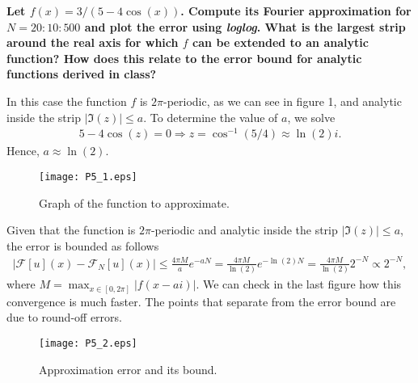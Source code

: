\textbf{Let $f(x)=3/(5-4\cos(x))$. Compute its Fourier approximation for $N = 20 : 10 : 500$ and plot the error using \textsl{loglog}. What is the largest strip around the real axis for which $f$ can be extended to an analytic function? How does this relate to the error bound for analytic functions derived in class?}
\newline

In this case the function $f$ is $2\pi$-periodic, as we can see in figure 1, and analytic inside the strip $|\Im(z)|\leq a$. To determine the value of $a$, we solve
\begin{align*}
5-4\cos(z)=0 \Rightarrow z=\cos^{-1}(5/4)\approx\ln(2)i. 
\end{align*}
Hence, $a\approx \ln(2)$. 
\begin{figure}[H]
\centering     %
{\texttt{[image: P5\_1.eps]}}
\caption{Graph of the function to approximate.}
\end{figure}

Given that the function is $2\pi$-periodic and analytic inside the strip $|\Im(z)|\leq a$, the error is bounded as follows
\begin{align*}
\left|\mathcal{F}[u](x)-\mathcal{F}_N[u](x)\right|\leq \frac{4\pi M}{a}e^{-aN} = \frac{4\pi M}{\ln(2)}e^{-\ln(2)N} = \frac{4\pi M}{\ln(2)}2^{-N} \propto 2^{-N},
\end{align*}
where $M = \max_{x\in[0,2\pi]}|f(x-ai)|$. We can check in the last figure how this convergence is much faster. The points that separate from the error bound are due to round-off errors.
\begin{figure}[H]
\centering     %
{\texttt{[image: P5\_2.eps]}}
\caption{Approximation error and its bound.}
\end{figure}

